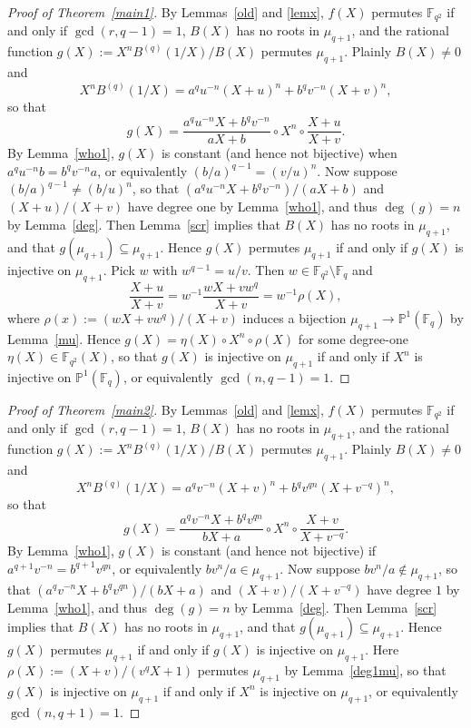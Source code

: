 \documentclass[11pt]{amsart}
\numberwithin{equation}{section}
\theoremstyle{definition}
\newcommand{\F}{\mathbb{F}}
\newcommand{\bP}{\mathbb{P}}
\begin{document}
\begin{proof}[Proof of Theorem~\ref{main1}]
By Lemmas~\ref{old} and \ref{lemx}, $f(X)$ permutes $\F_{q^2}$ if and only if $\gcd(r,q-1)=1$, $B(X)$ has no roots in $\mu_{q+1}$, and
the rational function $g(X):=X^n B^{(q)}(1/X)/B(X)$ permutes $\mu_{q+1}$.  Plainly $B(X)\ne 0$ and
\[
X^n B^{(q)}(1/X) = a^qu^{-n} (X+u)^n + b^qv^{-n} (X+v)^n,
\]
so that
\[
g(X) = \frac{a^qu^{-n}X + b^qv^{-n}} {aX+b}\circ X^n \circ \frac{X+u}{X+v}.
\]
By Lemma~\ref{who1}, $g(X)$ is constant (and hence not bijective) when $a^q u^{-n}b = b^qv^{-n}a$, or equivalently $(b/a)^{q-1}=(v/u)^n$.  Now suppose $(b/a)^{q-1}\ne (b/u)^n$, so that $(a^q u^{-n} X + b^q v^{-n})/(aX+b)$ and $(X+u)/(X+v)$ have degree one by Lemma~\ref{who1}, and thus $\deg(g)=n$ by Lemma~\ref{deg}.
Then Lemma~\ref{scr} implies that $B(X)$ has no roots
in $\mu_{q+1}$, and that $g(\mu_{q+1})\subseteq\mu_{q+1}$.
Hence $g(X)$ permutes $\mu_{q+1}$ if and only if $g(X)$ is injective on $\mu_{q+1}$.
Pick $w$ with $w^{q-1}=u/v$.  Then $w \in \F_{q^2}\setminus\F_q$ and
\[
\frac{X+u}{X+v} = w^{-1}\frac{wX+vw^q}{X+v} = w^{-1}\rho(X),
\]
where $\rho(x):=(wX+vw^q)/(X+v)$  induces a bijection $\mu_{q+1}\to \bP^1(\F_q)$ by Lemma~\ref{mu}.  Hence  $g(X) = \eta(X)\circ X^n\circ\rho(X)$ for some degree-one $\eta(X)\in\F_{q^2}(X)$, so that $g(X)$ is
injective on $\mu_{q+1}$ if and only if $X^n$ is injective on $\bP^1(\F_q)$, or equivalently $\gcd(n,q-1)=1$.
\end{proof}

\begin{proof}[Proof of Theorem~\ref{main2}]
By Lemmas~\ref{old} and \ref{lemx}, $f(X)$ permutes $\F_{q^2}$ if and only if $\gcd(r,q-1)=1$, $B(X)$ has no roots in $\mu_{q+1}$, and
the rational function $g(X):=X^n B^{(q)}(1/X)/B(X)$ permutes $\mu_{q+1}$.  Plainly $B(X)\ne 0$ and
\[
X^n B^{(q)}(1/X) = a^qv^{-n} (X+v)^n + b^q v^{qn} (X+v^{-q})^n,
\]
so that
\[
g(X) = \frac{a^qv^{-n} X + b^q v^{qn}}{bX+a}\circ X^n\circ\frac{X+v}{X+v^{-q}}.
\]
By Lemma~\ref{who1}, $g(X)$ is constant (and hence not bijective) if $a^{q+1}v^{-n}=b^{q+1}v^{qn}$, or equivalently $bv^n/a\in\mu_{q+1}$.
Now suppose $bv^n/a\notin\mu_{q+1}$, so that $(a^qv^{-n} X + b^q v^{qn})/(bX+a)$ and $(X+v)/(X+v^{-q})$ have degree $1$ by Lemma~\ref{who1}, and thus $\deg(g)=n$ by Lemma~\ref{deg}.
Then Lemma~\ref{scr} implies that $B(X)$ has no roots
in $\mu_{q+1}$, and that $g(\mu_{q+1})\subseteq\mu_{q+1}$.
Hence $g(X)$ permutes $\mu_{q+1}$ if and only if $g(X)$ is injective on $\mu_{q+1}$.
Here  $\rho(X) := (X + v)/(v^q X+1)$ permutes $\mu_{q+1}$ by Lemma~\ref{deg1mu}, so that
$g(X)$ is injective on $\mu_{q+1}$ if and only if $X^n$ is injective on $\mu_{q+1}$, or equivalently $\gcd(n,q+1)=1$.
\end{proof}
\end{document}
